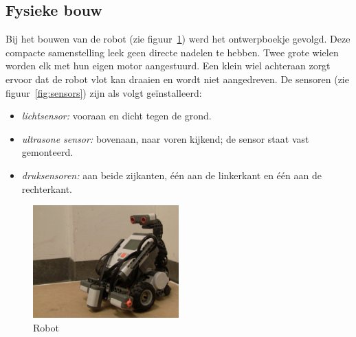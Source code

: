 \documentclass[t1]{penoverslag}
\begin{document}
\subsection{Fysieke bouw} %
\label{ssec:fysbouw}
Bij het bouwen van de robot (zie figuur~\ref{robot}) werd het ontwerpboekje gevolgd. Deze compacte samenstelling leek geen directe nadelen te hebben. Twee grote wielen worden elk met hun eigen motor aangestuurd. Een klein wiel achteraan zorgt ervoor dat de robot vlot kan draaien en wordt niet aangedreven. De sensoren (zie figuur~\ref{fig:sensors}) zijn als volgt ge\"installeerd: 

\begin{itemize}
\item \textit{lichtsensor:} vooraan en dicht tegen de grond.
\item \textit{ultrasone sensor:} bovenaan, naar voren kijkend; de sensor staat vast gemonteerd.
\item \textit{druksensoren:} aan beide zijkanten, \'e\'en aan de linkerkant en \'e\'en aan de rechterkant.
\end{itemize}

\begin{figure}[tbp]
\begin{center}
    \includegraphics[width=0.5\textwidth]{robot}
    \caption{Robot}
    \label{robot}
\end{center}
\end{figure}
\end{document}
